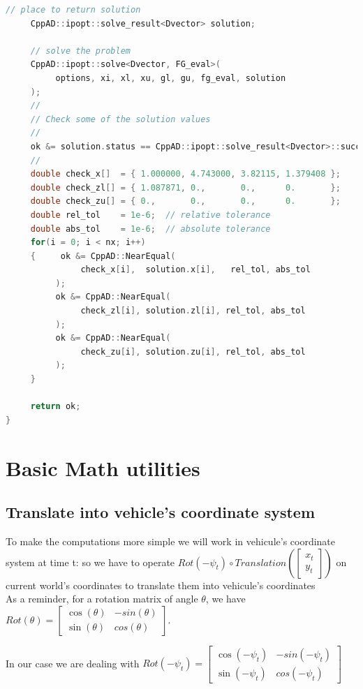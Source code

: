 \documentclass[11pt]{article}
\begin{document}
\begin{lstlisting}[language=C++, caption={Simple example with ipopt}]
     // place to return solution
     CppAD::ipopt::solve_result<Dvector> solution;

     // solve the problem
     CppAD::ipopt::solve<Dvector, FG_eval>(
          options, xi, xl, xu, gl, gu, fg_eval, solution
     );
     //
     // Check some of the solution values
     //
     ok &= solution.status == CppAD::ipopt::solve_result<Dvector>::success;
     //
     double check_x[]  = { 1.000000, 4.743000, 3.82115, 1.379408 };
     double check_zl[] = { 1.087871, 0.,       0.,      0.       };
     double check_zu[] = { 0.,       0.,       0.,      0.       };
     double rel_tol    = 1e-6;  // relative tolerance
     double abs_tol    = 1e-6;  // absolute tolerance
     for(i = 0; i < nx; i++)
     {     ok &= CppAD::NearEqual(
               check_x[i],  solution.x[i],   rel_tol, abs_tol
          );
          ok &= CppAD::NearEqual(
               check_zl[i], solution.zl[i], rel_tol, abs_tol
          );
          ok &= CppAD::NearEqual(
               check_zu[i], solution.zu[i], rel_tol, abs_tol
          );
     }

     return ok;
}


\end{lstlisting}

\section{Basic Math utilities}

\subsection{Translate into vehicle's coordinate system}

To make the computations more simple we will work in vehicule's coordinate system at time t: so we have to operate $Rot(-\psi_t) \circ Translation(\begin{bmatrix}
x_t \\ 
y_t
\end{bmatrix}) $ on current world's coordinates to translate them into vehicule's coordinates\\

As a reminder, for a rotation matrix of angle $\theta$, we have $ Rot(\theta) = \begin{bmatrix}
\cos(\theta) & -sin(\theta) \\ 
\sin(\theta) & cos(\theta)
\end{bmatrix}$.

In our case we are dealing with $ Rot(-\psi_t) = \begin{bmatrix}
\cos(-\psi_t) & -sin(-\psi_t) \\ 
\sin(-\psi_t) & cos(-\psi_t)
\end{bmatrix}$\\
\end{document}
